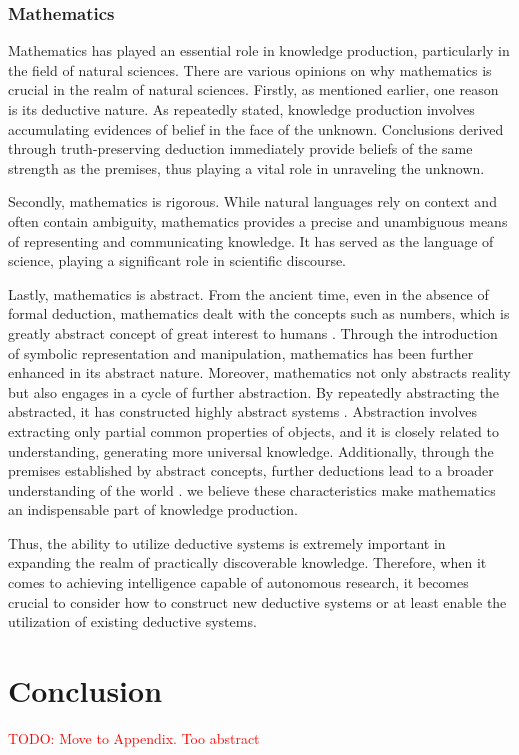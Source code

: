 \documentclass{book}
\begin{document}
\subsubsection{Mathematics}
Mathematics has played an essential role in knowledge production, particularly in the field of natural sciences. There are various opinions on why mathematics is crucial in the realm of natural sciences. Firstly, as mentioned earlier, one reason is its deductive nature. As repeatedly stated, knowledge production involves accumulating evidences of belief in the face of the unknown. Conclusions derived through truth-preserving deduction immediately provide beliefs of the same strength as the premises, thus playing a vital role in unraveling the unknown. 

Secondly, mathematics is rigorous. While natural languages rely on context and often contain ambiguity, mathematics provides a precise and unambiguous means of representing and communicating knowledge. It has served as the language of science, playing a significant role in scientific discourse.

Lastly, mathematics is abstract. From the ancient time, even in the absence of formal deduction, mathematics dealt with the concepts such as numbers, which is greatly abstract concept of great interest to humans \cite{david2010history}. Through the introduction of symbolic representation and manipulation, mathematics has been further enhanced in its abstract nature. Moreover, mathematics not only abstracts reality but also engages in a cycle of further abstraction. By repeatedly abstracting the abstracted, it has constructed highly abstract systems \cite{bochner1966role}. Abstraction involves extracting only partial common properties of objects, and it is closely related to understanding, generating more universal knowledge. Additionally, through the premises established by abstract concepts, further deductions lead to a broader understanding of the world \cite{heisenberg2008abstraction}. we believe these characteristics make mathematics an indispensable part of knowledge production. 

Thus, the ability to utilize deductive systems is extremely important in expanding the realm of practically discoverable knowledge. Therefore, when it comes to achieving intelligence capable of autonomous research, it becomes crucial to consider how to construct new deductive systems or at least enable the utilization of existing deductive systems.

\section{Conclusion}
\textcolor{red}{TODO: Move to Appendix. Too abstract}
\end{document}
